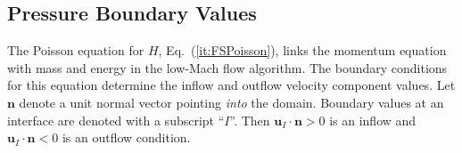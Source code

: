 \documentclass[journal,article,atmosphere,submit,moreauthors,pdftex]{Definitions_Review_Process/mdpi}
\begin{document}




\subsection{Pressure Boundary Values}

The Poisson equation for $H$, Eq.~(\ref{it:FSPoisson}), links the momentum equation with mass and energy in the low-Mach flow algorithm.  The boundary conditions for this equation determine the inflow and outflow velocity component values.  Let $\mathbf{n}$ denote a unit normal vector pointing \emph{into} the domain.  Boundary values at an interface are denoted with a subscript ``$I$''.  Then $\mathbf{u}_I\cdot\mathbf{n}>0$ is an inflow and $\mathbf{u}_I\cdot\mathbf{n}<0$ is an outflow condition.
\end{document}
